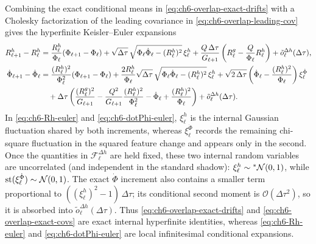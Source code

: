 Combining the exact conditional means in \eqref{eq:ch6-overlap-exact-drifts} with a Cholesky factorization of the leading covariance in \eqref{eq:ch6-overlap-leading-cov} gives the hyperfinite Keisler--Euler expansions
\begin{align}
R_{\ell+1}^h - R_\ell^h
&= \frac{R_\ell^h}{\Phi_\ell}(\Phi_{\ell+1} - \Phi_\ell)
   + \sqrt{\Delta\tau}\,\sqrt{\Phi_\ell \dot{\Phi}_\ell - (R_\ell^h)^2}\,\xi_\ell^h
   + \frac{Q\,\Delta\tau}{G_{\ell+1}}\left(R_\ell^g - \frac{Q}{\Phi_\ell} R_\ell^h\right)
   + \tilde{o}_\ell^{\Delta h}(\Delta\tau), \label{eq:ch6-Rh-euler} \\
\dot{\Phi}_{\ell+1} - \dot{\Phi}_\ell
&= \frac{(R_\ell^h)^2}{\Phi_\ell^2}(\Phi_{\ell+1} - \Phi_\ell)
   + \frac{2 R_\ell^h}{\Phi_\ell}\sqrt{\Delta\tau}\,\sqrt{\Phi_\ell \dot{\Phi}_\ell - (R_\ell^h)^2}\,\xi_\ell^h
   + \sqrt{2\,\Delta\tau}\left(\dot{\Phi}_\ell - \frac{(R_\ell^h)^2}{\Phi_\ell}\right)\xi_\ell^{\dot{\Phi}} \notag \\
&\quad + \Delta\tau\left(\frac{(R_\ell^g)^2}{G_{\ell+1}} - \frac{Q^2}{G_{\ell+1}}\frac{(R_\ell^h)^2}{\Phi_\ell^2} - \dot{\Phi}_\ell + \frac{(R_\ell^h)^2}{\Phi_\ell}\right)
   + \tilde{o}_\ell^{\Delta h}(\Delta\tau). \label{eq:ch6-dotPhi-euler}
\end{align}
In \eqref{eq:ch6-Rh-euler} and \eqref{eq:ch6-dotPhi-euler}, $\xi_\ell^h$ is the internal Gaussian fluctuation shared by both increments, whereas $\xi_\ell^{\dot{\Phi}}$ records the remaining chi-square fluctuation in the squared feature change and appears only in the second. Once the quantities in $\mathcal{F}_\ell^{\Delta h}$ are held fixed, these two internal random variables are uncorrelated (and independent in the standard shadow): $\xi_\ell^h \sim {}^*\mathcal{N}(0, 1)$, while $\operatorname{st}(\xi_\ell^{\dot{\Phi}}) \sim \mathcal{N}(0, 1)$. The exact $\dot{\Phi}$ increment also contains a smaller term proportional to $((\xi_\ell^h)^2 - 1)\,\Delta\tau$; its conditional second moment is $\mathcal{O}(\Delta\tau^2)$, so it is absorbed into $\tilde{o}_\ell^{\Delta h}(\Delta\tau)$. Thus \eqref{eq:ch6-overlap-exact-drifts} and \eqref{eq:ch6-overlap-exact-covs} are exact internal hyperfinite identities, whereas \eqref{eq:ch6-Rh-euler} and \eqref{eq:ch6-dotPhi-euler} are local infinitesimal conditional expansions.

